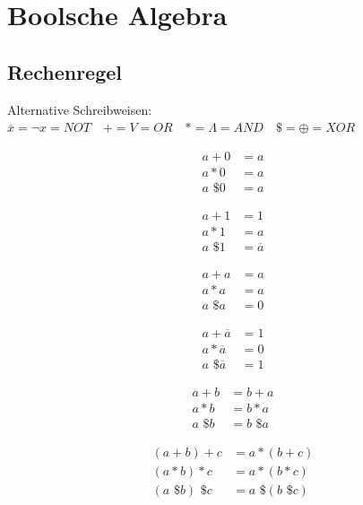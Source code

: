 \section{Boolsche Algebra}
\subsection{Rechenregel}
Alternative Schreibweisen:
$\overline{x} = \lnot x = NOT \quad + = V = OR \quad * = \Lambda = AND \quad  \text{\$ } = \oplus = XOR$

\begin{minipage}{0.11\textwidth}
	\begin{align*}
		a + 0 &= a \\
		a * 0 &= a \\
		a \text{ \$ } 0 &= a
	\end{align*}
\end{minipage}
\begin{minipage}{0.11\textwidth}
	\begin{align*}
		a + 1 &= 1 \\
		a * 1 &= a\\
		a \text{ \$ } 1 &= \overline{a}
	\end{align*}
\end{minipage}
\begin{minipage}{0.11\textwidth}
	\begin{align*}
		a + a &= a \\
		a * a &= a \\
		a \text{ \$ } a &= 0
	\end{align*}
\end{minipage}
\begin{minipage}{0.11\textwidth}
	\begin{align*}
		a + \overline{a} &= 1 \\
		a * \overline{a} &= 0 \\
		a \text{ \$ } \overline{a} &= 1
	\end{align*}
\end{minipage}

\begin{minipage}{0.2\textwidth}
	\begin{align*}
		a + b &= b + a \\
		a * b &= b * a \\
		a \text{ \$ } b &= b \text{ \$ } a
	\end{align*}
\end{minipage}
\begin{minipage}{0.2\textwidth}
	\begin{align*}
		(a + b) + c &= a *(b + c) \\
		(a * b) * c &= a *(b * c) \\
		(a \text{ \$ } b) \text{ \$ } c &= a \text{ \$ }(b \text{ \$ } c)
	\end{align*}
\end{minipage}

